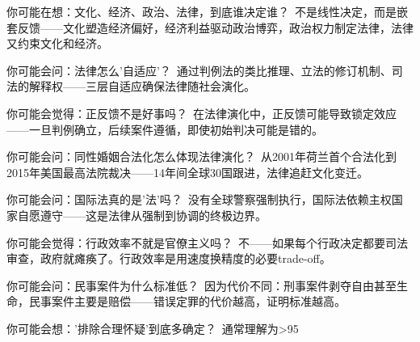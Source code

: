 \documentclass[a4paper,12pt]{book}
\newenvironment{motivation}{\begin{tcolorbox}[colback=gray!10,colframe=gray!60,title=\textit{动机}]\small\itshape}{\end{tcolorbox}}
\begin{document}
\begin{motivation}
\begin{motivation}
\begin{motivation}
	\begin{tcolorbox}[colback=yellow!5, title=\textit{读者行为预测}]
		你可能在想：文化、经济、政治、法律，到底谁决定谁？\ 不是线性决定，而是嵌套反馈——文化塑造经济偏好，经济利益驱动政治博弈，政治权力制定法律，法律又约束文化和经济。
	\end{tcolorbox}


	\begin{tcolorbox}[colback=yellow!5, title=\textit{读者行为预测}]
		你可能会问：法律怎么'自适应'？\ 通过判例法的类比推理、立法的修订机制、司法的解释权——三层自适应确保法律随社会演化。
	\end{tcolorbox}


	\begin{tcolorbox}[colback=yellow!5, title=\textit{读者行为预测}]
		你可能会觉得：正反馈不是好事吗？\ 在法律演化中，正反馈可能导致锁定效应——一旦判例确立，后续案件遵循，即使初始判决可能是错的。
	\end{tcolorbox}


	\begin{tcolorbox}[colback=yellow!5, title=\textit{读者行为预测}]
		你可能会问：同性婚姻合法化怎么体现法律演化？\ 从2001年荷兰首个合法化到2015年美国最高法院裁决——14年间全球30国跟进，法律追赶文化变迁。
	\end{tcolorbox}


	\begin{tcolorbox}[colback=yellow!5, title=\textit{读者行为预测}]
		你可能会问：国际法真的是'法'吗？\ 没有全球警察强制执行，国际法依赖主权国家自愿遵守——这是法律从强制到协调的终极边界。
	\end{tcolorbox}


	\begin{tcolorbox}[colback=yellow!5, title=\textit{读者行为预测}]
		你可能会觉得：行政效率不就是官僚主义吗？\ 不——如果每个行政决定都要司法审查，政府就瘫痪了。行政效率是用速度换精度的必要trade-off。
	\end{tcolorbox}


	\begin{tcolorbox}[colback=yellow!5, title=\textit{读者行为预测}]
		你可能会问：民事案件为什么标准低？\ 因为代价不同：刑事案件剥夺自由甚至生命，民事案件主要是赔偿——错误定罪的代价越高，证明标准越高。
	\end{tcolorbox}


	\begin{tcolorbox}[colback=yellow!5, title=\textit{读者行为预测}]
		你可能会想：'排除合理怀疑'到底多确定？\ 通常理解为>95%
	\end{tcolorbox}



\end{motivation}
\end{motivation}
\end{motivation}
\end{document}
